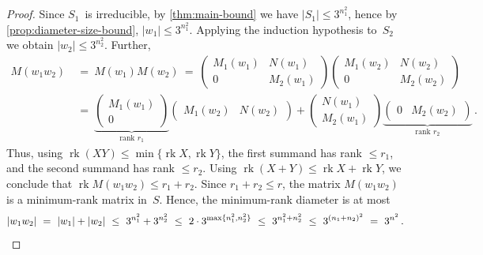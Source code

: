 \documentclass{lmcs}
\theoremstyle{definition}
\newcommand{\rk}{\operatorname{rk}}
\begin{document}
\begin{proof}
Since $S_1$~is irreducible, by \cref{thm:main-bound} we have $|S_1| \le 3^{n_1^2}$, hence by \cref{prop:diameter-size-bound}, $|w_1| \le 3^{n_1^2}$.
Applying the induction hypothesis to~$S_2$ we obtain $|w_2| \le 3^{n_2^2}$.
Further,
\begin{align*}
M(w_1 w_2) \ &= \ M(w_1) M(w_2) \ = \ 
\begin{pmatrix}
    M_1(w_1) & N(w_1) \\ 0 & M_2(w_1)
\end{pmatrix}
\begin{pmatrix}
    M_1(w_2) & N(w_2) \\ 0 & M_2(w_2)
\end{pmatrix} \\
&= \ 
\underbrace{\begin{pmatrix}
    M_1(w_1) \\ 0 
\end{pmatrix}}_{\text{rank } r_1}
\begin{pmatrix}
    M_1(w_2) & N(w_2)
\end{pmatrix}
+
\begin{pmatrix}
    N(w_1) \\ M_2(w_1)
\end{pmatrix}
\underbrace{
\begin{pmatrix}
   0 & M_2(w_2)
\end{pmatrix}
}_{\text{rank } r_2}\,.
\end{align*}
Thus, using $\rk(X Y) \le \min \{\rk X, \rk Y\}$, the first summand has rank $\le r_1$, and the second summand has rank $\le r_2$.
Using $\rk(X + Y) \le \rk X + \rk Y$, we conclude that $\rk M(w_1 w_2) \le r_1 + r_2$.
Since $r_1 + r_2 \le r$, the matrix $M(w_1 w_2)$ is a minimum-rank matrix in~$S$.
Hence, the minimum-rank diameter is at most
\[
  |w_1 w_2| \ = \ |w_1| + |w_2| \ \le \ 3^{n_1^2} + 3^{n_2^2} \ \le \ 2 \cdot 3^{\max\{n_1^2, n_2^2\}} \ \le \ 3^{n_1^2 + n_2^2} \ \le \ 3^{(n_1+n_2)^2} \ = \ 3^{n^2}\,. \qedhere
\]
\end{proof}
\end{document}

